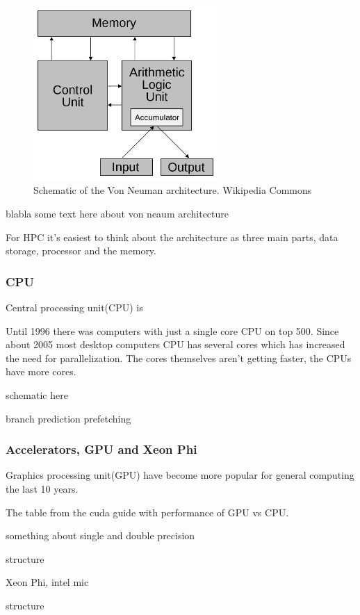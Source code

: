 \documentclass[10pt,a4paper]{article}
\begin{document}
\begin{figure}[h]
    \centering
    \includegraphics[width=7cm]{Von_Neumann_architecture.png}
    \caption{Schematic of the Von Neuman architecture. Wikipedia Commons}
    \label{fig:VonNeuman}
\end{figure}

blabla some text here about von neaum architecture

For HPC it's easiest to think about the architecture as three main parts, data storage, processor and the memory.\cite{intro_hpc}

\subsubsection{CPU}
Central processing unit(CPU) is 

Until 1996 there was computers with just a single core CPU on top 500\cite{TOP500}. Since about 2005 most desktop computers CPU has several cores which has increased the need for parallelization. The cores themselves aren't getting faster, the CPUs have more cores.

schematic here

branch prediction
prefetching

\subsubsection{Accelerators, GPU and Xeon Phi}
Graphics processing unit(GPU) have become more popular for general computing the last 10 years.

The table from the cuda guide with performance of GPU vs CPU.\cite{cuda}

something about single and double precision

structure

Xeon Phi, intel mic

structure
\end{document}
